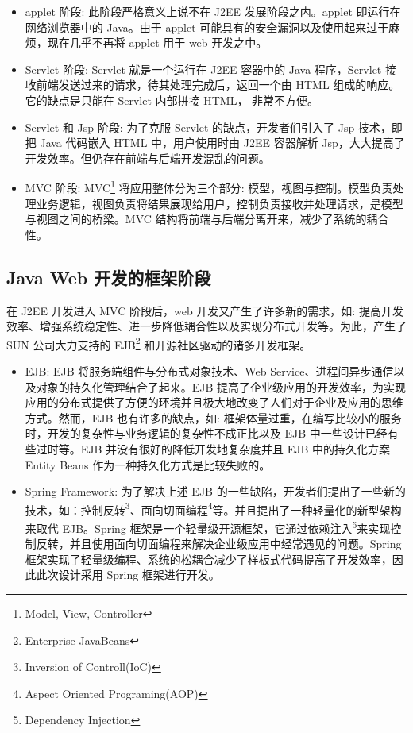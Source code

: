 \documentclass[a4paper, 12pt, UTF8]{ctexart}
\begin{document}
	\begin{itemize}
  \item applet 阶段: 此阶段严格意义上说不在 J2EE 发展阶段之内。applet 即运行在网络浏览器中的 Java。由于 applet 可能具有的安全漏洞以及使用起来过于麻烦，现在几乎不再将 applet 用于 web 开发之中\cite{Horstmann2016}。
  \item Servlet 阶段: Servlet 就是一个运行在 J2EE 容器中的 Java 程序，Servlet 接收前端发送过来的请求，待其处理完成后，返回一个由 HTML 组成的响应\cite{java8}。它的缺点是只能在 Servlet 内部拼接 HTML， 非常不方便。
  \item Servlet 和 Jsp 阶段: 为了克服 Servlet 的缺点，开发者们引入了 Jsp 技术，即把 Java 代码嵌入 HTML 中\cite{java8}，用户使用时由 J2EE 容器解析 Jsp，大大提高了开发效率。但仍存在前端与后端开发混乱的问题。
  \item MVC 阶段: MVC\footnote{Model, View, Controller} 将应用整体分为三个部分: 模型，视图与控制。模型负责处理业务逻辑，视图负责将结果展现给用户，控制负责接收并处理请求，是模型与视图之间的桥梁。MVC 结构将前端与后端分离开来，减少了系统的耦合性\cite{Warin2017}。
\end{itemize}

	\subsection{Java Web 开发的框架阶段}
	
	在 J2EE 开发进入 MVC 阶段后，web 开发又产生了许多新的需求，如: 提高开发效率、增强系统稳定性、进一步降低耦合性以及实现分布式开发等。为此，产生了 SUN 公司大力支持的 EJB\footnote{Enterprise JavaBeans} 和开源社区驱动的诸多开发框架。
	\begin{itemize}
  \item EJB: EJB 将服务端组件与分布式对象技术、Web Service、进程间异步通信以及对象的持久化管理结合了起来\cite{BillBurke2007}。EJB 提高了企业级应用的开发效率，为实现应用的分布式提供了方便的环境并且极大地改变了人们对于企业及应用的思维方式。然而，EJB 也有许多的缺点，如: 框架体量过重，在编写比较小的服务时，开发的复杂性与业务逻辑的复杂性不成正比以及 EJB 中一些设计已经有些过时等。EJB 并没有很好的降低开发地复杂度并且 EJB 中的持久化方案 Entity Beans 作为一种持久化方式是比较失败的\cite{Johnson2004}。
  \item Spring Framework: 为了解决上述 EJB 的一些缺陷，开发者们提出了一些新的技术，如：控制反转\footnote{Inversion of Controll(IoC)}、面向切面编程\footnote{Aspect Oriented Programing(AOP)}等。并且提出了一种轻量化的新型架构来取代 EJB。Spring 框架是一个轻量级开源框架，它通过依赖注入\footnote{Dependency Injection}来实现控制反转，并且使用面向切面编程来解决企业级应用中经常遇见的问题。Spring 框架实现了轻量级编程、系统的松耦合减少了样板式代码提高了开发效率\cite{Walls2016}，因此此次设计采用 Spring 框架进行开发。
\end{itemize}
\end{document}
